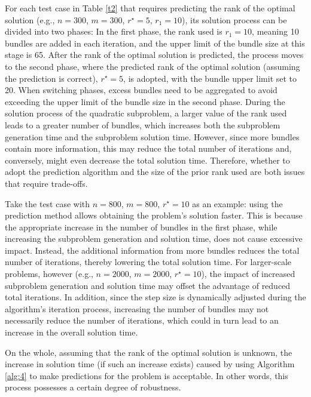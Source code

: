 \documentclass{jcmlatex}
\begin{document}
For each test case in Table \ref{t2} that requires predicting the rank of the optimal solution (e.g., \( n=300 \), \( m=300 \), \( r^{\star}=5 \), \( r_1=10 \)), its solution process can be divided into two phases: In the first phase, the rank used is \( r_1=10 \), meaning 10 bundles are added in each iteration, and the upper limit of the bundle size at this stage is 65. After the rank of the optimal solution is predicted, the process moves to the second phase, where the predicted rank of the optimal solution (assuming the prediction is correct), \( r^{\star}=5 \), is adopted, with the bundle upper limit set to 20. When switching phases, excess bundles need to be aggregated to avoid exceeding the upper limit of the bundle size in the second phase. During the solution process of the quadratic subproblem, a larger value of the rank used leads to a greater number of bundles, which increases both the subproblem generation time and the subproblem solution time. However, since more bundles contain more information, this may reduce the total number of iterations and, conversely, might even decrease the total solution time. Therefore, whether to adopt the prediction algorithm and the size of the prior rank used are both issues that require trade-offs.  

Take the test case with \( n=800 \), \( m=800 \), \( r^{\star}=10 \) as an example: using the prediction method allows obtaining the problem’s solution faster. This is because the appropriate increase in the number of bundles in the first phase, while increasing the subproblem generation and solution time, does not cause excessive impact. Instead, the additional information from more bundles reduces the total number of iterations, thereby lowering the total solution time. For larger-scale problems, however (e.g., \( n=2000 \), \( m=2000 \), \( r^{\star}=10 \)), the impact of increased subproblem generation and solution time may offset the advantage of reduced total iterations. In addition, since the step size is dynamically adjusted during the algorithm’s iteration process, increasing the number of bundles may not necessarily reduce the number of iterations, which could in turn lead to an increase in the overall solution time.  

On the whole, assuming that the rank of the optimal solution is unknown, the increase in solution time (if such an increase exists) caused by using Algorithm \ref{alg:4} to make predictions for the problem is acceptable. In other words, this process possesses a certain degree of robustness. 
\end{document}
